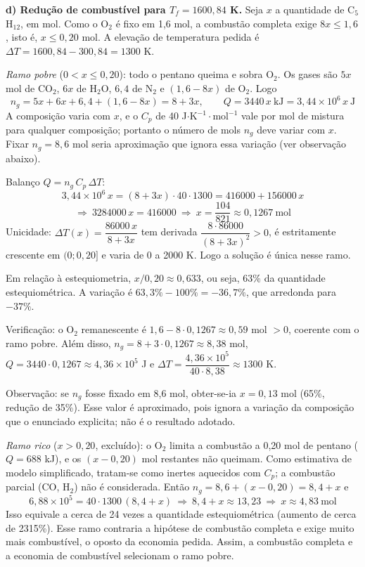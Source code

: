 \documentclass{article}%
\begin{document}
\textbf{d) Redução de combustível para $T_f=1600{,}84$ K.} Seja $x$ a quantidade de C$_5$H$_{12}$, em mol. Como o O$_2$ é fixo em 1,6 mol, a combustão completa exige $8x\le1{,}6$, isto é, $x\le0{,}20$ mol. A elevação de temperatura pedida é $\Delta T=1600{,}84-300{,}84=1300$ K.

\emph{Ramo pobre} ($0<x\le0{,}20$): todo o pentano queima e sobra O$_2$. Os gases são $5x$ mol de CO$_2$, $6x$ de H$_2$O, $6{,}4$ de N$_2$ e $(1{,}6-8x)$ de O$_2$. Logo
\[
n_g=5x+6x+6{,}4+(1{,}6-8x)=8+3x,\qquad Q=3440\,x\ \text{kJ}=3{,}44\times10^{6}\,x\ \text{J}
\]
A composição varia com $x$, e o $C_p$ de 40 J$\cdot$K$^{-1}\cdot$mol$^{-1}$ vale por mol de mistura para qualquer composição; portanto o número de mols $n_g$ deve variar com $x$. Fixar $n_g=8{,}6$ mol seria aproximação que ignora essa variação (ver observação abaixo).

Balanço $Q=n_g\,C_p\,\Delta T$:
\[
3{,}44\times10^{6}\,x=(8+3x)\cdot40\cdot1300=416000+156000\,x
\]
\[
\Rightarrow\ 3284000\,x=416000\ \Rightarrow\ x=\frac{104}{821}\approx0{,}1267\ \text{mol}
\]
Unicidade: $\Delta T(x)=\dfrac{86000\,x}{8+3x}$ tem derivada $\dfrac{8\cdot86000}{(8+3x)^2}>0$, é estritamente crescente em $(0;0{,}20]$ e varia de 0 a 2000 K. Logo a solução é única nesse ramo.

Em relação à estequiometria, $x/0{,}20\approx0{,}633$, ou seja, 63\% da quantidade estequiométrica. A variação é $63{,}3\%-100\%=-36{,}7\%$, que arredonda para $-37\%$.

Verificação: o O$_2$ remanescente é $1{,}6-8\cdot0{,}1267\approx0{,}59$ mol $>0$, coerente com o ramo pobre. Além disso, $n_g=8+3\cdot0{,}1267\approx8{,}38$ mol, $Q=3440\cdot0{,}1267\approx4{,}36\times10^{5}$ J e $\Delta T=\dfrac{4{,}36\times10^{5}}{40\cdot8{,}38}\approx1300$ K.

Observação: se $n_g$ fosse fixado em 8,6 mol, obter-se-ia $x=0{,}13$ mol (65\%, redução de 35\%). Esse valor é aproximado, pois ignora a variação da composição que o enunciado explicita; não é o resultado adotado.

\emph{Ramo rico} ($x>0{,}20$, excluído): o O$_2$ limita a combustão a 0,20 mol de pentano ($Q=688$ kJ), e os $(x-0{,}20)$ mol restantes não queimam. Como estimativa de modelo simplificado, tratam-se como inertes aquecidos com $C_p$; a combustão parcial (CO, H$_2$) não é considerada. Então $n_g=8{,}6+(x-0{,}20)=8{,}4+x$ e
\[
6{,}88\times10^{5}=40\cdot1300\,(8{,}4+x)\ \Rightarrow\ 8{,}4+x\approx13{,}23\ \Rightarrow\ x\approx4{,}83\ \text{mol}
\]
Isso equivale a cerca de 24 vezes a quantidade estequiométrica (aumento de cerca de 2315\%). Esse ramo contraria a hipótese de combustão completa e exige muito mais combustível, o oposto da economia pedida. Assim, a combustão completa e a economia de combustível selecionam o ramo pobre.
\end{document}
